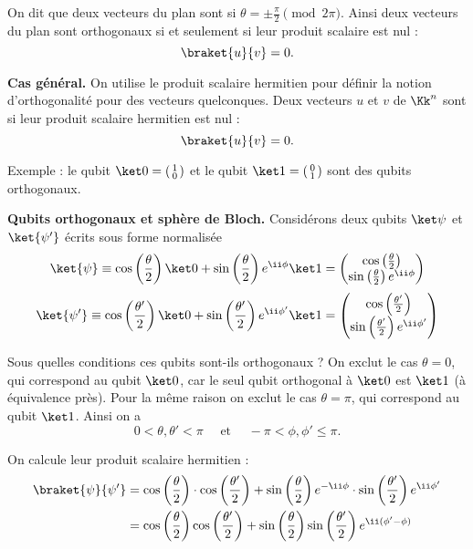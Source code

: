 \documentclass[11pt,class=report,crop=false]{standalone}
\begin{document}


On dit que deux vecteurs du plan sont  si $\theta = \pm \frac\pi2 \pmod{2\pi}$.
Ainsi deux vecteurs du plan sont orthogonaux si et seulement si leur produit scalaire est nul :
$$\braket{u}{v} = 0.$$



\bigskip
\textbf{Cas général.}
On utilise le produit scalaire hermitien pour définir la notion d'orthogonalité pour des vecteurs quelconques. 
Deux vecteurs $u$ et $v$ de $\Kk^n$ sont 
si leur produit scalaire hermitien est nul :
$$\braket{u}{v} = 0.$$


Exemple : le qubit $\ket 0 = \left(\begin{smallmatrix}1\\0\end{smallmatrix}\right)$ et le qubit $\ket 1 = \left(\begin{smallmatrix}0\\1\end{smallmatrix}\right)$ sont des qubits orthogonaux.

\bigskip
\textbf{Qubits orthogonaux et sphère de Bloch.}
Considérons deux qubits $\ket\psi$ et $\ket{\psi'}$ écrits sous forme normalisée 
$$\ket{\psi} \equiv \cos\left(\frac\theta2\right)\ket0+ \sin\left(\frac\theta2\right)e^{\ii\phi}\ket1 
= \begin{pmatrix}\cos\left(\frac\theta2\right) \\ \sin\left(\frac\theta2\right)e^{\ii\phi}\end{pmatrix}
$$
$$\ket{\psi'} \equiv \cos\left(\frac{\theta'}2\right)\ket0+ \sin\left(\frac{\theta'}2\right)e^{\ii\phi'}\ket1
= \begin{pmatrix}\cos\left(\frac{\theta'}2\right) \\ \sin\left(\frac{\theta'}2\right)e^{\ii\phi'}\end{pmatrix}
$$

Sous quelles conditions ces qubits sont-ils orthogonaux ?
On exclut le cas $\theta=0$, qui correspond au qubit $\ket0$,
car le seul qubit orthogonal à $\ket0$ est $\ket1$ (à équivalence près).
Pour la même raison on exclut le cas $\theta=\pi$, qui correspond au qubit $\ket1$.
Ainsi on a 
$$0<\theta,\theta'<\pi \quad \text{ et } \quad -\pi < \phi,\phi' \le \pi.$$

On calcule leur produit scalaire hermitien :
\begin{align*}
\braket{\psi}{\psi'}
&= \cos\left(\frac\theta2\right) \cdot \cos\left(\frac{\theta'}2\right)
+ \sin\left(\frac\theta2\right)e^{-\ii\phi} \cdot \sin\left(\frac{\theta'}2\right)e^{\ii\phi'} \\
&= \cos\left(\frac\theta2\right)\cos\left(\frac{\theta'}2\right)
+ \sin\left(\frac\theta2\right)\sin\left(\frac{\theta'}2\right)e^{\ii(\phi'-\phi)}
\end{align*}
\end{document}
